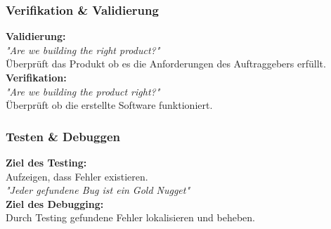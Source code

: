 \begin{multicols}{2}
	\subsubsection{Verifikation \& Validierung}
	\textbf{Validierung:}\\
	\textit{"{}Are we building the right product?"}\\
	Überprüft das Produkt ob es die Anforderungen des Auftraggebers erfüllt.\\
	\textbf{Verifikation:}\\
	\textit{"{}Are we building the product right?"}\\
	Überprüft ob die erstellte Software funktioniert.\\
	
	\subsubsection{Testen \& Debuggen}
	\textbf{Ziel des Testing:} \\
	Aufzeigen, dass Fehler existieren.\\
	\textit{"{}Jeder gefundene Bug ist ein Gold Nugget"}\\
	\textbf{Ziel des Debugging:} \\
	Durch Testing gefundene Fehler lokalisieren und beheben.
	
\end{multicols}

